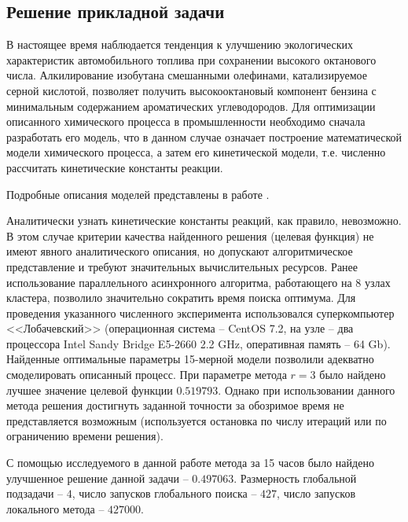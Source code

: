 \documentclass[11pt, oneside, a4paper]{article}
\begin{document}
\subsection{Решение прикладной задачи}

В настоящее время наблюдается тенденция к улучшению экологических характеристик автомобильного топлива при сохранении высокого октанового числа. Алкилирование изобутана смешанными олефинами, катализируемое серной кислотой, позволяет получить высокооктановый компонент бензина с минимальным содержанием ароматических углеводородов. Для оптимизации описанного химического процесса в промышленности необходимо сначала разработать его модель, что в данном случае означает построение математической модели химического процесса, а затем его кинетической модели, т.е. численно рассчитать кинетические константы реакции.

Подробные описания моделей представлены в работе \cite{KinModel2022}. 

Аналитически узнать кинетические константы реакций, как правило, невозможно. В этом случае критерии качества найденного решения (целевая функция) не имеют явного аналитического описания, но допускают алгоритмическое представление и требуют значительных вычислительных ресурсов. Ранее использование параллельного асинхронного алгоритма, работающего на 8 узлах кластера, позволило значительно сократить время поиска оптимума. Для проведения указанного численного эксперимента использовался суперкомпьютер <<Лобачевский>> (операционная система -- CentOS 7.2, на узле -- два процессора Intel Sandy Bridge E5-2660 2.2 GHz, оперативная память -- 64 Gb). Найденные оптимальные параметры 15-мерной модели позволили адекватно смоделировать описанный процесс. При параметре метода  $r = 3$ было найдено лучшее значение целевой функции $0.519793$. Однако при использовании данного метода решения достигнуть заданной точности за обозримое время не представляется возможным (используется остановка по числу итераций или по ограничению времени решения).

С помощью исследуемого в данной работе метода за 15 часов было найдено улучшенное решение данной задачи -- $0.497063$. Размерность глобальной подзадачи -- $4$, число запусков глобального поиска -- $427$, число запусков локального метода -- $427 000$.
\end{document}
